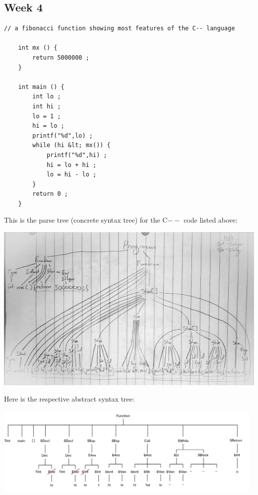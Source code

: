 \documentclass{article}
\theoremstyle{theorem}
\theoremstyle{definition}
\theoremstyle{remark}
\begin{document}
\subsection{Week 4}
\label{sec:week4}

\medskip\noindent
\begin{lstlisting}[style=CStyle]
    // a fibonacci function showing most features of the C-- language

    int mx () {
        return 5000000 ;
    }

    int main () {
        int lo ; 
        int hi ;
        lo = 1 ;
        hi = lo ;
        printf("%d",lo) ;
        while (hi &lt; mx()) {
            printf("%d",hi) ;
            hi = lo + hi ;
            lo = hi - lo ;
        }
        return 0 ;
    }
\end{lstlisting}

\medskip\noindent
This is the parse tree (concrete syntax tree) for the C$--$ code listed above:

\medskip\noindent
\includegraphics[width=1\textwidth]{Images/ConcreteSyntaxTree.jpg}

\medskip\noindent
Here is the respective abstract syntax tree:

\medskip\noindent
\begin{center}
\includegraphics[width=0.98\textwidth]{Images/fib_ast.png}
\end{center}
\end{document}
